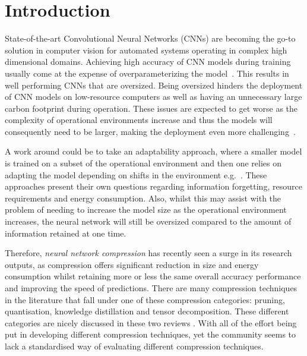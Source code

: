 \section{Introduction}

State-of-the-art Convolutional Neural Networks (CNNs) are becoming the go-to solution in computer vision for automated systems operating in complex high dimensional domains. 
%
Achieving high accuracy of CNN models during training usually come at the expense of overparameterizing the model~\cite{Neill2020}.
%
This results in well performing CNNs that are oversized. 
%
Being oversized hinders the deployment of CNN models on low-resource computers as well as having an unnecessary large carbon footprint during operation.
%
These issues are expected to get worse as the complexity of operational environments increase and thus the models will consequently need to be larger, making the deployment even more challenging~\cite{Marino2023, Brown2020}.  

A work around could be to take an adaptability approach, where a smaller model is trained on a subset of the operational environment and then one relies on adapting the model depending on shifts in the environment e.g.~\cite{Ghobrial2022, mirza2022norm}.
%
These approaches present their own questions regarding information forgetting, resource requirements and energy consumption.
%
Also, whilst this may assist with the problem of needing to increase the model size as the operational environment increases,
the neural network will still be oversized compared to the amount of information retained at one time. 

Therefore, \textit{neural network compression} has recently seen a surge in its research outputs, as compression offers significant reduction in size and energy consumption whilst retaining more or less the same overall accuracy performance and improving the speed of predictions. 
%
There are many compression techniques in the literature that fall under one of these compression categories: pruning, quantisation, knowledge distillation and tensor decomposition. These different categories are nicely discussed in these two reviews \cite{Neill2020}\cite{Marino2023}.
%
With all of the effort being put in developing different compression techniques, yet the community seems to lack a standardised way of evaluating different compression techniques.

